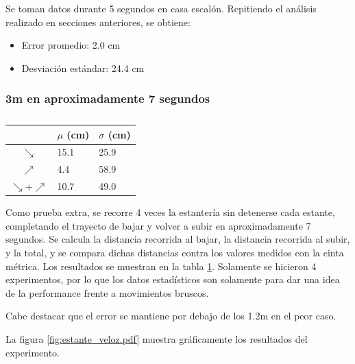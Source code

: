 \documentclass[main]{subfiles}
\begin{document}
Se toman datos durante 5 segundos en casa escalón. Repitiendo el análisis realizado en secciones anteriores, se obtiene:
\begin{itemize}
\item Error promedio: 2.0 cm
\item Desviación estándar: 24.4 cm
\end{itemize}

\subsubsection{3m en aproximadamente 7 segundos}

\begin{table}
\vspace{-105pt}
\hspace{10pt}
\begin{tabular}{c|p{40pt}|p{40pt}|} 
\cline{2-3}
  & $\mu$ (cm) & $\sigma$ (cm)\\ \hline
\multicolumn{1}{|c|}{$\searrow$} & 15.1 & 25.9 \\ \hline
\multicolumn{1}{|c|}{$\nearrow$} & 4.4 &  58.9 \\ \hline
\multicolumn{1}{|c|}{$\searrow$+$\nearrow$} & 10.7 & 49.0 \\ \hline
\end{tabular}
\caption{}
\label{tab:ruido-rms}
\vspace{-15pt}
\end{table}

Como prueba extra, se recorre 4 veces la estantería sin detenerse cada estante, completando el trayecto de bajar y volver a subir en aproximadamente 7 segundos. Se calcula la distancia recorrida al bajar, la distancia recorrida al subir, y la total, y se compara dichas distancias contra los valores medidos con la cinta métrica. Los resultados se muestran en la tabla \ref{tab:ruido-rms}. Solamente se hicieron 4 experimentos, por lo que los datos estadísticos son solamente para dar una idea de la performance frente a movimientos bruscos.

Cabe destacar que el error se mantiene por debajo de los 1.2m en el peor caso.

La figura \ref{fig:estante_veloz.pdf} muestra gráficamente los resultados del experimento.
\end{document}
